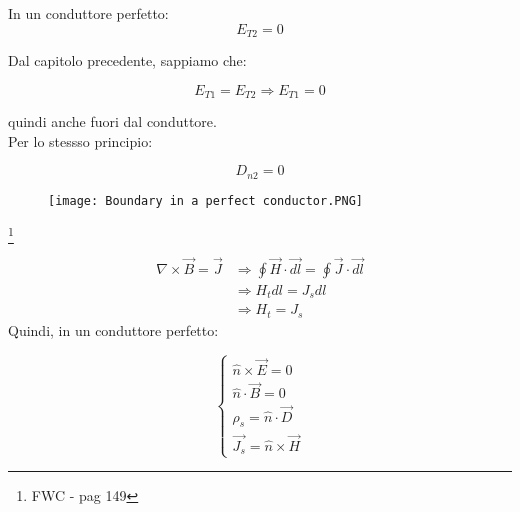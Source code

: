 In un conduttore perfetto: 
{
    \Large
    \begin{equation}
    E_{T2} = 0       
    \end{equation}
}

Dal capitolo precedente, sappiamo che: 

{
    \Large
    \begin{equation}
    E_{T1} = E_{T2} \Rightarrow E_{T1} = 0        
    \end{equation}
}

quindi anche fuori dal conduttore. \\ 

Per lo stessso principio: 

{
    \Large
    \begin{equation}
    D_{n2} = 0       
    \end{equation}
}


\begin{figure}[h]
    \centering 
    \texttt{[image: Boundary in a perfect conductor.PNG]}
\end{figure} 

\footnote{FWC - pag 149}

{\Large \begin{equation}
    \begin{split}
        \nabla \times \vec{B} 
        = \vec{J} 
        &\Rightarrow \oint \vec{H} \cdot \vec{dl} 
        = \oint \vec{J} \cdot \vec{dl}
        \\ 
        &\Rightarrow H_t dl = J_s dl
        \\
        &\Rightarrow H_t = J_s    
    \end{split}
\end{equation}}
Quindi, in un conduttore perfetto: 

{\Large \begin{equation}
    \begin{cases}
        \hat{n} \times \vec{E} = 0 \\ 
        \hat{n} \cdot \vec{B} = 0 \\ 
        \rho_s = \hat{n} \cdot \vec{D} \\ 
        \vec{J_s} = \hat{n} \times \vec{H}
    \end{cases}
\end{equation}}



